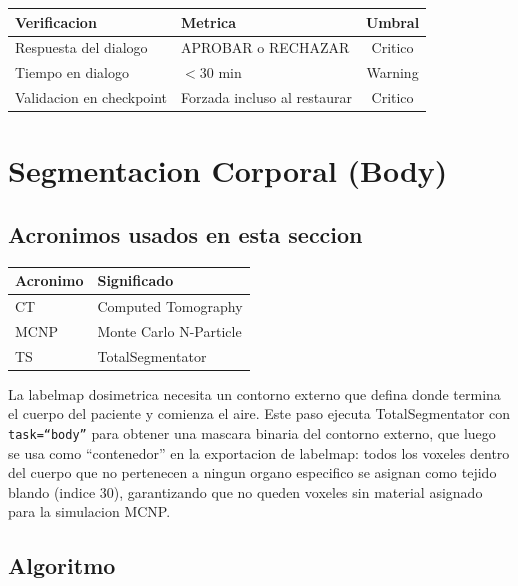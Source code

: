 \documentclass[12pt,a4paper]{article}
\begin{document}
\begin{table}[H]
\centering
\begin{tabular}{llc}
\toprule
\textbf{Verificacion} & \textbf{Metrica} & \textbf{Umbral} \\
\midrule
Respuesta del dialogo & APROBAR o RECHAZAR & Critico \\
Tiempo en dialogo & $< 30$ min & Warning \\
Validacion en checkpoint & Forzada incluso al restaurar & Critico \\
\bottomrule
\end{tabular}
\end{table}

\newpage

\section{Segmentacion Corporal (Body)}
\label{sec:body}

\subsection*{Acronimos usados en esta seccion}
\begin{tabular}{ll}
\toprule
\textbf{Acronimo} & \textbf{Significado} \\
\midrule
CT & Computed Tomography \\
MCNP & Monte Carlo N-Particle \\
TS & TotalSegmentator \\
\bottomrule
\end{tabular}

La labelmap dosimetrica necesita un contorno externo que defina donde termina el cuerpo del
paciente y comienza el aire. Este paso ejecuta TotalSegmentator con \texttt{task=``body''} para
obtener una mascara binaria del contorno externo, que luego se usa como ``contenedor'' en la
exportacion de labelmap: todos los voxeles dentro del cuerpo que no pertenecen a ningun organo
especifico se asignan como tejido blando (indice 30), garantizando que no queden voxeles sin
material asignado para la simulacion MCNP.

\subsection{Algoritmo}
\end{document}
